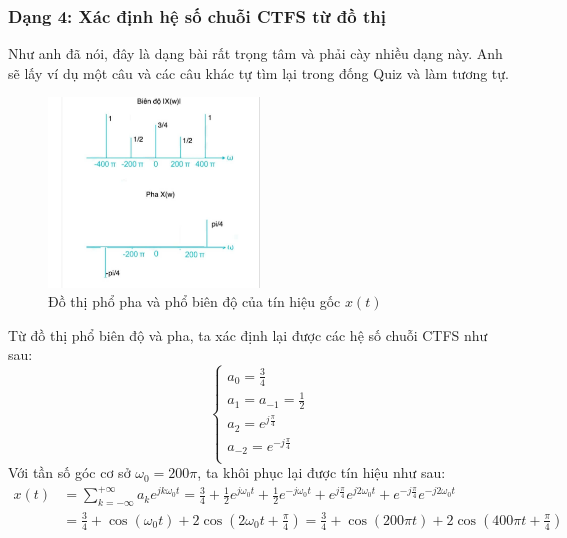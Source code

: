 \documentclass{article}
\begin{document}
\subsubsection{Dạng 4: Xác định hệ số chuỗi CTFS từ đồ thị}
Như anh đã nói, đây là dạng bài rất trọng tâm và phải cày nhiều dạng này. Anh sẽ lấy ví dụ một câu và các câu khác tự tìm lại trong đống Quiz và làm tương tự.
\begin{figure}[H]
\centering
\includegraphics[width=0.5\textwidth]{fs.jpg}
\caption{Đồ thị phổ pha và phổ biên độ của tín hiệu gốc $x(t)$}
\end{figure}
Từ đồ thị phổ biên độ và pha, ta xác định lại được các hệ số chuỗi CTFS như sau:
\begin{equation*}
    \begin{cases}
        a_{0}=\frac{3}{4}\\
        a_{1}=a_{-1}=\frac{1}{2}\\
        a_{2}=e^{j\frac{\pi}{4}}\\
        a_{-2}=e^{-j\frac{\pi}{4}}\\
    \end{cases}
\end{equation*}
Với tần số góc cơ sở $\omega_{0}=200\pi$, ta khôi phục lại được tín hiệu như sau:
\begin{equation*}
    \begin{split}
    x(t)&=\sum_{k=-\infty}^{+\infty}a_{k}e^{jk\omega_{0}t}=\frac{3}{4}+\frac{1}{2}e^{j\omega_{0}t}+\frac{1}{2}e^{-j\omega_{0}t}+e^{j\frac{\pi}{4}}e^{j2\omega_{0}t}+e^{-j\frac{\pi}{4}}e^{-j2\omega_{0}t}\\&=\frac{3}{4}+\cos{(\omega_{0}t)}+2\cos{\left(2\omega_{0}t+\frac{\pi}{4}\right)}=\frac{3}{4}+\cos{(200\pi t)}+2\cos{\left(400\pi t+\frac{\pi}{4}\right)}
    \end{split}
\end{equation*}
\end{document}

